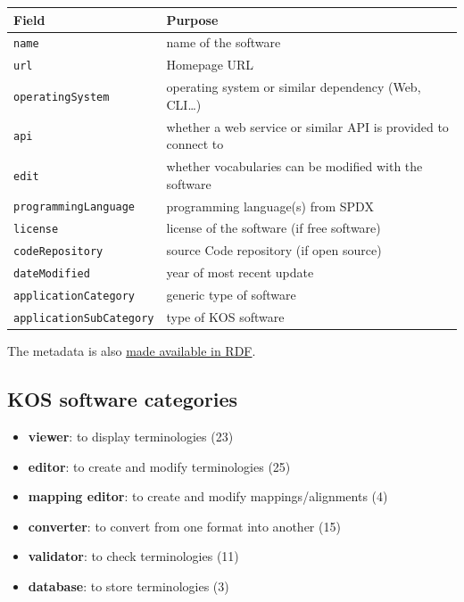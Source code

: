 \documentclass[
  DIV=10]{article}
\newcounter{none} %
\providecommand{\tightlist}{%
  \setlength{\itemsep}{0pt}\setlength{\parskip}{0pt}}
\begin{document}
{\def\LTcaptype{none} %
\begin{longtable}[]{@{}
  >{\raggedright\arraybackslash}p{}
  >{\raggedright\arraybackslash}p{}@{}}
\toprule\noalign{}
\begin{minipage}[b]{\linewidth}\raggedright
Field
\end{minipage} & \begin{minipage}[b]{\linewidth}\raggedright
Purpose
\end{minipage} \\
\midrule\noalign{}
\endhead
\bottomrule\noalign{}
\endlastfoot
\texttt{name} & name of the software \\
\texttt{url} & Homepage URL \\
\texttt{operatingSystem} & operating system or similar dependency (Web,
CLI\ldots) \\
\texttt{api} & whether a web service or similar API is provided to
connect to \\
\texttt{edit} & whether vocabularies can be modified with the
software \\
\texttt{programmingLanguage} & programming language(s) from SPDX \\
\texttt{license} & license of the software (if free software) \\
\texttt{codeRepository} & source Code repository (if open source) \\
\texttt{dateModified} & year of most recent update \\
\texttt{applicationCategory} & generic type of software \\
\texttt{applicationSubCategory} & type of KOS software \\
\end{longtable}
}

The metadata is also \href{kos-software.ttl}{made available in RDF}.

\subsection{KOS software categories}\label{kos-software-categories}

\begin{itemize}
\tightlist
\item
  \textbf{viewer}: to display terminologies (23)
\item
  \textbf{editor}: to create and modify terminologies (25)
\item
  \textbf{mapping editor}: to create and modify mappings/alignments (4)
\item
  \textbf{converter}: to convert from one format into another (15)
\item
  \textbf{validator}: to check terminologies (11)
\item
  \textbf{database}: to store terminologies (3)
\end{itemize}
\end{document}

